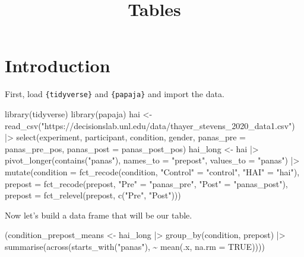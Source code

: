 \documentclass[
  doc]{apa6}
\title{Tables}
\author{\phantom{0}}
\date{}
\affiliation{\phantom{0}}
\newenvironment{Shaded}{\begin{snugshade}}{\end{snugshade}}
\newcommand{\AttributeTok}[1]{\textcolor[rgb]{0.77,0.63,0.00}{#1}}
\newcommand{\ConstantTok}[1]{\textcolor[rgb]{0.00,0.00,0.00}{#1}}
\newcommand{\FunctionTok}[1]{\textcolor[rgb]{0.00,0.00,0.00}{#1}}
\newcommand{\NormalTok}[1]{#1}
\newcommand{\OtherTok}[1]{\textcolor[rgb]{0.56,0.35,0.01}{#1}}
\newcommand{\SpecialCharTok}[1]{\textcolor[rgb]{0.00,0.00,0.00}{#1}}
\newcommand{\StringTok}[1]{\textcolor[rgb]{0.31,0.60,0.02}{#1}}
\begin{document}
\maketitle

\hypertarget{introduction}{%
\section{Introduction}\label{introduction}}

First, load \texttt{\{tidyverse\}} and \texttt{\{papaja\}} and import the data.

\begin{Shaded}
\begin{Highlighting}[]
\FunctionTok{library}\NormalTok{(tidyverse)}
\FunctionTok{library}\NormalTok{(papaja)}
\NormalTok{hai }\OtherTok{\textless{}{-}} \FunctionTok{read\_csv}\NormalTok{(}\StringTok{"https://decisionslab.unl.edu/data/thayer\_stevens\_2020\_data1.csv"}\NormalTok{) }\SpecialCharTok{|\textgreater{}}
  \FunctionTok{select}\NormalTok{(experiment, participant, condition, gender,}
         \AttributeTok{panas\_pre =}\NormalTok{ panas\_pre\_pos, }\AttributeTok{panas\_post =}\NormalTok{ panas\_post\_pos)}
\NormalTok{hai\_long }\OtherTok{\textless{}{-}}\NormalTok{ hai }\SpecialCharTok{|\textgreater{}}
  \FunctionTok{pivot\_longer}\NormalTok{(}\FunctionTok{contains}\NormalTok{(}\StringTok{"panas"}\NormalTok{), }\AttributeTok{names\_to =} \StringTok{"prepost"}\NormalTok{, }\AttributeTok{values\_to =} \StringTok{"panas"}\NormalTok{) }\SpecialCharTok{|\textgreater{}}
  \FunctionTok{mutate}\NormalTok{(}\AttributeTok{condition =} \FunctionTok{fct\_recode}\NormalTok{(condition, }\StringTok{"Control"} \OtherTok{=} \StringTok{"control"}\NormalTok{, }\StringTok{"HAI"} \OtherTok{=} \StringTok{"hai"}\NormalTok{),}
         \AttributeTok{prepost =} \FunctionTok{fct\_recode}\NormalTok{(prepost, }\StringTok{"Pre"} \OtherTok{=} \StringTok{"panas\_pre"}\NormalTok{, }\StringTok{"Post"} \OtherTok{=} \StringTok{"panas\_post"}\NormalTok{),}
         \AttributeTok{prepost =} \FunctionTok{fct\_relevel}\NormalTok{(prepost, }\FunctionTok{c}\NormalTok{(}\StringTok{"Pre"}\NormalTok{, }\StringTok{"Post"}\NormalTok{)))}
\end{Highlighting}
\end{Shaded}

Now let's build a data frame that will be our table.

\begin{Shaded}
\begin{Highlighting}[]
\NormalTok{(condition\_prepost\_means }\OtherTok{\textless{}{-}}\NormalTok{ hai\_long }\SpecialCharTok{|\textgreater{}}
  \FunctionTok{group\_by}\NormalTok{(condition, prepost) }\SpecialCharTok{|\textgreater{}}
  \FunctionTok{summarise}\NormalTok{(}\FunctionTok{across}\NormalTok{(}\FunctionTok{starts\_with}\NormalTok{(}\StringTok{"panas"}\NormalTok{), }\SpecialCharTok{\textasciitilde{}} \FunctionTok{mean}\NormalTok{(.x, }\AttributeTok{na.rm =} \ConstantTok{TRUE}\NormalTok{))))}
\end{Highlighting}
\end{Shaded}
\end{document}
